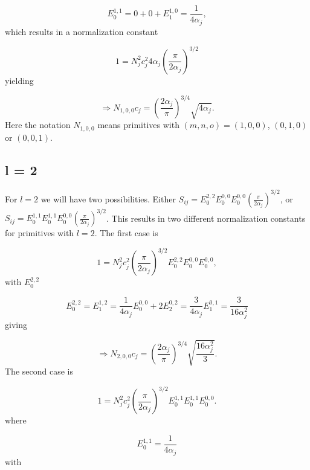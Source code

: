 \documentclass[a4paper,norsk,11pt,twoside]{report}
\begin{document}
\begin{equation}
E_0^{1,1} = 0 + 0 + E_1^{1,0} = \frac{1}{4\alpha_j}  ,
\end{equation}
which results in a normalization constant 

\begin{equation}
1 = N_j^2 c_j^2 4\alpha_j \left(\frac{\pi}{2\alpha_j}\right)^{3/2} 
\end{equation}
yielding

\begin{equation}
\Rightarrow N_{1,0,0} c_j = \left( \frac{2\alpha_j}{\pi} \right)^{3/4} \sqrt{4\alpha_j} .
\end{equation}
Here the notation $N_{1,0,0}$ means primitives with $(m,n,o) = (1,0,0)$, $(0,1,0)$ or $(0,0,1)$.

\subsection{l = 2}
For $l = 2$ we will have two possibilities. Either $S_{ij} = E_0^{2,2} E_0^{0,0} E_0^{0,0} \left(\frac{\pi}{2\alpha_j}\right)^{3/2}$, or $S_{ij} = E_0^{1,1} E_0^{1,1} E_0^{0,0} \left(\frac{\pi}{2\alpha_j}\right)^{3/2}$. 
This results in two different normalization constants for primitives with $l = 2$. The first case is

\begin{equation}
1 = N_j^2 c_j^2 \left(\frac{\pi}{2\alpha_j}\right)^{3/2} E_0^{2,2} E_0^{0,0} E_0^{0,0} , 
\end{equation}
with $E_0^{2,2}$

\begin{equation}
E_0^{2,2} = E_1^{1,2} = \frac{1}{4\alpha_j} E_0^{0,0} + 2E_2^{0,2} = \frac{3}{4\alpha_j} E_1^{0,1} = \frac{3}{16 \alpha_j^2} 
\end{equation}
giving

\begin{equation}
\Rightarrow N_{2,0,0} c_j =  \left( \frac{2\alpha_j}{\pi} \right)^{3/4} \sqrt{\frac{16 \alpha_j^2}{3}} .
\end{equation}
The second case is 

\begin{equation}
1 = N_j^2 c_j^2 \left(\frac{\pi}{2\alpha_j}\right)^{3/2} E_0^{1,1} E_0^{1,1} E_0^{0,0} . 
\end{equation}
where

\begin{equation}
E_0^{1,1} = \frac{1}{4\alpha_j} 
\end{equation}
with 
\end{document}
